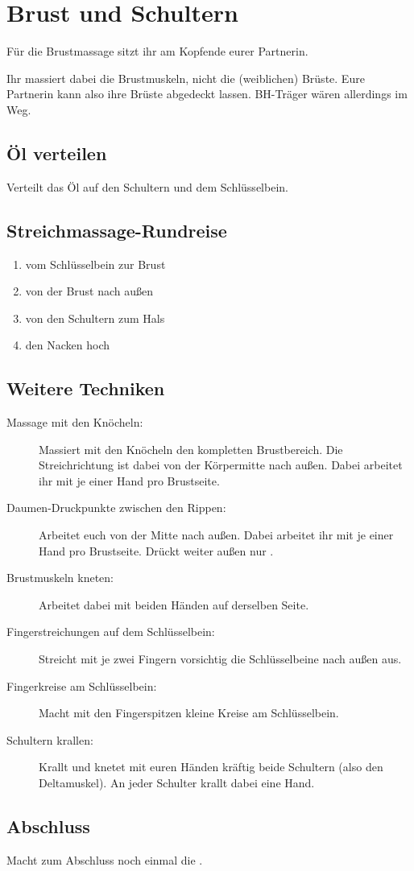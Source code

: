 \section{Brust und Schultern}

Für die Brustmassage sitzt ihr am Kopfende eurer Partnerin.

Ihr massiert dabei die Brustmuskeln, nicht die (weiblichen) Brüste. Eure Partnerin kann also ihre Brüste abgedeckt lassen. BH-Träger wären allerdings im Weg.

\subsection{Öl verteilen}
Verteilt das Öl auf den Schultern und dem Schlüsselbein.

\subsection{Streichmassage-Rundreise}

\begin{oframed}
  \begin{enumerate}
    \item vom Schlüsselbein zur Brust
    \item von der Brust nach außen
    \item von den Schultern zum Hals
    \item den Nacken hoch
  \end{enumerate}
\end{oframed}

\subsection{Weitere Techniken}
\begin{description}
  \item [Massage mit den Knöcheln:] Massiert mit den Knöcheln den kompletten Brustbereich. Die Streichrichtung ist dabei von der Körpermitte nach außen. Dabei arbeitet ihr mit je einer Hand pro Brustseite.
  \item [Daumen-Druckpunkte zwischen den Rippen:] Arbeitet euch von der Mitte nach außen. Dabei arbeitet ihr mit je einer Hand pro Brustseite. Drückt weiter außen nur .
  \item [Brustmuskeln kneten:] Arbeitet dabei mit beiden Händen auf derselben Seite.
  \item [Fingerstreichungen auf dem Schlüsselbein:] Streicht mit je zwei Fingern vorsichtig die Schlüsselbeine nach außen aus.
  \item [Fingerkreise am Schlüsselbein:] Macht mit den Fingerspitzen kleine Kreise am Schlüsselbein.
  \item [Schultern krallen:] Krallt und knetet mit euren Händen kräftig  beide Schultern (also den Deltamuskel). An jeder Schulter krallt dabei eine Hand.
\end{description}

\subsection{Abschluss}

Macht zum Abschluss noch einmal die .
